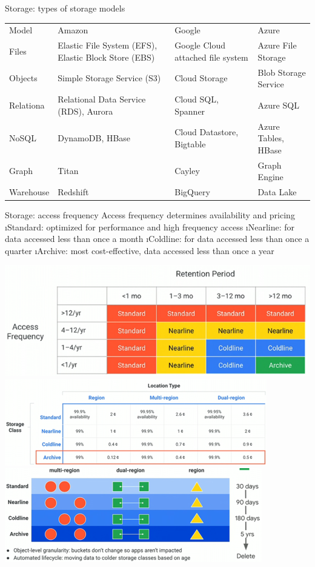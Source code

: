 \begin{frame}[allowframebreaks]{Storage: types of storage models}
\begin{table}
    \centering
    \begin{tabular}{llll}
        Model& Amazon& Google& Azure\\
        Files & Elastic File System (EFS), Elastic Block Store (EBS) & Google Cloud attached file system & Azure File Storage\\
        Objects & Simple Storage Service (S3) & Cloud Storage & Blob Storage Service \\
        Relationa& Relational Data Service (RDS), Aurora & Cloud SQL, Spanner & Azure SQL\\
        NoSQL& DynamoDB, HBase& Cloud Datastore, Bigtable & Azure Tables, HBase\\
        Graph& Titan& Cayley& Graph Engine\\
        Warehouse& Redshift & BigQuery& Data Lake\\
    \end{tabular}
\end{table}
\end{frame}

\begin{frame}[allowframebreaks]{Storage: access frequency}
Access frequency determines availability and pricing
\i Standard: optimized for performance and high frequency access
\i Nearline: for data accessed less than once a month
\i Coldline: for data accessed less than once a quarter
\i Archive: most cost-effective, data accessed less than once a year

\includegraphics[width=\linewidth]{imgs/gc_accessfrequency.png}
\includegraphics[width=\linewidth]{imgs/gc_accessfrequency_region.png}
\includegraphics[width=\linewidth]{imgs/gc_accessfrequency_region2.png}
\end{frame}

